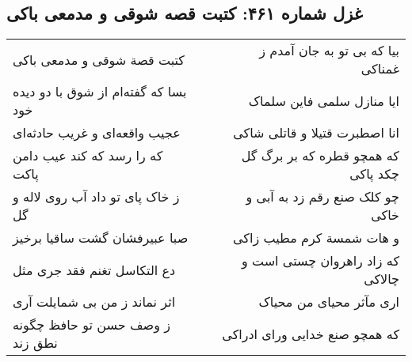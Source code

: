 \begin{center}
\section*{غزل شماره ۴۶۱: کتبت قصه شوقی و مدمعی باکی}
\label{sec:sh461}
\begin{longtable}{l p{0.5cm} r}
کتبت قصة شوقی و مدمعی باکی
&&
بیا که بی تو به جان آمدم ز غمناکی
\\
بسا که گفته‌ام از شوق با دو دیده خود
&&
ایا منازل سلمی فاین سلماک
\\
عجیب واقعه‌ای و غریب حادثه‌ای
&&
انا اصطبرت قتیلا و قاتلی شاکی
\\
که را رسد که کند عیب دامن پاکت
&&
که همچو قطره که بر برگ گل چکد پاکی
\\
ز خاک پای تو داد آب روی لاله و گل
&&
چو کلک صنع رقم زد به آبی و خاکی
\\
صبا عبیرفشان گشت ساقیا برخیز
&&
و هات شمسة کرم مطیب زاکی
\\
دع التکاسل تغنم فقد جری مثل
&&
که زاد راهروان چستی است و چالاکی
\\
اثر نماند ز من بی شمایلت آری
&&
اری مآثر محیای من محیاک
\\
ز وصف حسن تو حافظ چگونه نطق زند
&&
که همچو صنع خدایی ورای ادراکی
\\
\end{longtable}
\end{center}
